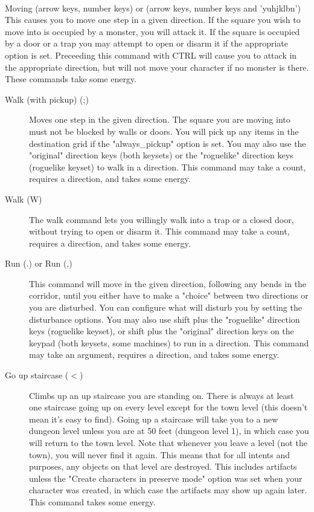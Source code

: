 \paragraph{}Moving (arrow keys, number
keys) or (arrow keys, number keys and 'yuhjklbn') This causes you to
move one step in a given direction. If the square you wish to move into
is occupied by a monster, you will attack it. If the square is occupied
by a door or a trap you may attempt to open or disarm it if the
appropriate option is set.  Preceeding this command with CTRL will cause
you to attack in the appropriate direction, but will not move your
character if no monster is there. These commands take some energy.
\begin{description} \item[Walk (with pickup) (;)] Moves one step in the
        given direction. The square you are moving into must not be
        blocked by walls or doors. You will pick up any items in the
        destination grid if the "always\_pickup" option is set.  You may
        also use the "original" direction keys (both keysets) or the
        "roguelike" direction keys (roguelike keyset) to walk in a
        direction. This command may take a count, requires a direction,
        and takes some energy.

    \item[Walk (W)] The walk command lets you willingly walk into a trap
        or a closed door, without trying to open or disarm it. This
        command may take a count, requires a direction, and takes some
        energy.

    \item[Run (.) or Run (,)] This command will move in the given
        direction, following any bends in the corridor, until you either
        have to make a "choice" between two directions or you are
        disturbed. You can configure what will disturb you by setting
        the disturbance options. You may also use shift plus the
        "roguelike" direction keys (roguelike keyset), or shift plus the
        "original" direction keys on the keypad (both keysets, some
        machines) to run in a direction. This command may take an
        argument, requires a direction, and takes some energy.

    \item[Go up staircase ($<$)] Climbs up an up staircase you are
        standing on. There is always at least one staircase going up on
        every level except for the town level (this doesn't mean it's
        easy to find). Going up a staircase will take you to a new
        dungeon level unless you are at 50 feet (dungeon level 1), in
        which case you will return to the town level. Note that whenever
        you leave a level (not the town), you will never find it again.
        This means that for all intents and purposes, any objects on
        that level are destroyed. This includes artifacts unless the
        "Create characters in preserve mode" option was set when your
        character was created, in which case the artifacts may show up
        again later. This command takes some energy.


\end{description}

